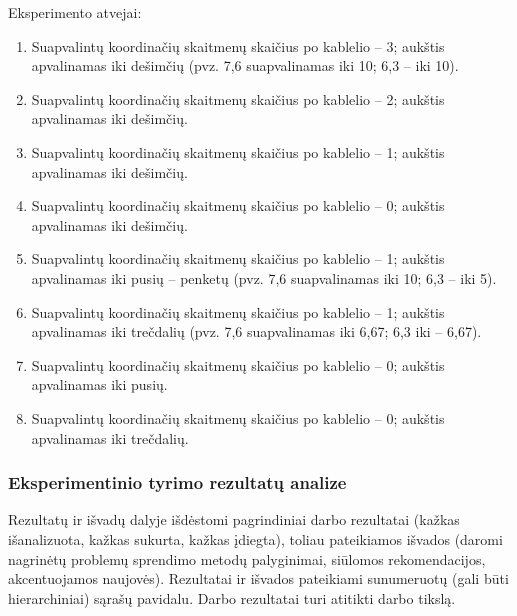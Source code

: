 \documentclass{VUMIFPSbakalaurinis}
\begin{document}
Eksperimento atvejai:
\begin{enumerate}
	\item Suapvalintų koordinačių skaitmenų skaičius po kablelio – 3; aukštis apvalinamas iki dešimčių (pvz. 7,6 suapvalinamas iki 10; 6,3 – iki 10).
	\item Suapvalintų koordinačių skaitmenų skaičius po kablelio – 2; aukštis apvalinamas iki dešimčių.
	\item Suapvalintų koordinačių skaitmenų skaičius po kablelio – 1; aukštis apvalinamas iki dešimčių.
	\item Suapvalintų koordinačių skaitmenų skaičius po kablelio – 0; aukštis apvalinamas iki dešimčių.
	\item Suapvalintų koordinačių skaitmenų skaičius po kablelio – 1; aukštis apvalinamas iki pusių – penketų (pvz. 7,6 suapvalinamas iki 10; 6,3 – iki 5).
	\item Suapvalintų koordinačių skaitmenų skaičius po kablelio – 1; aukštis apvalinamas iki trečdalių (pvz. 7,6 suapvalinamas iki 6,67; 6,3 iki – 6,67).
	\item Suapvalintų koordinačių skaitmenų skaičius po kablelio – 0; aukštis apvalinamas iki pusių.
	\item Suapvalintų koordinačių skaitmenų skaičius po kablelio – 0; aukštis apvalinamas iki trečdalių.
\end{enumerate}

 \label{subsubsubsec:exp5}

 \label{subsubsubsec:exp6}

\subsubsection{Eksperimentinio tyrimo rezultatų analize}



Rezultatų ir išvadų dalyje išdėstomi pagrindiniai darbo rezultatai (kažkas
išanalizuota, kažkas sukurta, kažkas įdiegta), toliau pateikiamos išvados
(daromi nagrinėtų problemų sprendimo metodų palyginimai, siūlomos
rekomendacijos, akcentuojamos naujovės). Rezultatai ir išvados pateikiami
sunumeruotų (gali būti hierarchiniai) sąrašų pavidalu. Darbo rezultatai turi
atitikti darbo tikslą.

\printbibliography[heading=bibintoc]  %
\end{document}
